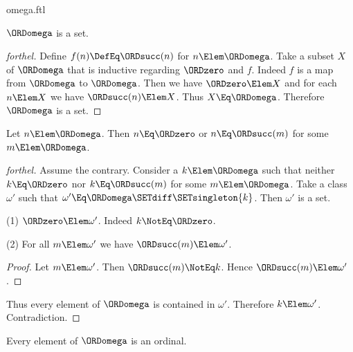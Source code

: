 \documentclass{stex}
\begin{document}
\begin{smodule}{omega.ftl}
\begin{corollary}[forthel]
  $\ORDomega$ is a set.
\end{corollary}
\begin{proof}[forthel]
  Define $f(n) \DefEq \ORDsucc(n)$ for $n \Elem \ORDomega$.
  Take a subset $X$ of $\ORDomega$ that is inductive regarding $\ORDzero$ and $f$.
  Indeed $f$ is a map from $\ORDomega$ to $\ORDomega$.
  Then we have $\ORDzero \Elem X$ and for each $n \Elem X$ we have $\ORDsucc(n) \Elem X$.
  Thus $X \Eq \ORDomega$.
  Therefore $\ORDomega$ is a set.
\end{proof}

\begin{proposition}[forthel]
  Let $n \Elem \ORDomega$.
  Then $n \Eq \ORDzero$ or $n \Eq \ORDsucc(m)$ for some $m \Elem \ORDomega$.
\end{proposition}
\begin{proof}[forthel]
  Assume the contrary.
  Consider a $k \Elem \ORDomega$ such that neither $k \Eq \ORDzero$ nor $k \Eq \ORDsucc(m)$ for
  some $m \Elem \ORDomega$.
  Take a class $\omega'$ such that $\omega' \Eq \ORDomega \SETdiff \SETsingleton{k}$. %
  Then $\omega'$ is a set.

  (1) $\ORDzero \Elem \omega'$.
  Indeed $k \NotEq \ORDzero$.

  (2) For all $m \Elem \omega'$ we have $\ORDsucc(m) \Elem \omega'$.
  \begin{proof}
    Let $m \Elem \omega'$.
    Then $\ORDsucc(m) \NotEq k$.
    Hence $\ORDsucc(m) \Elem \omega'$.
  \end{proof}

  Thus every element of $\ORDomega$ is contained in $\omega'$.
  Therefore $k \Elem \omega'$.
  Contradiction.
\end{proof}

\begin{proposition}[forthel]
  Every element of $\ORDomega$ is an ordinal.
\end{proposition}
\end{smodule}
\end{document}
